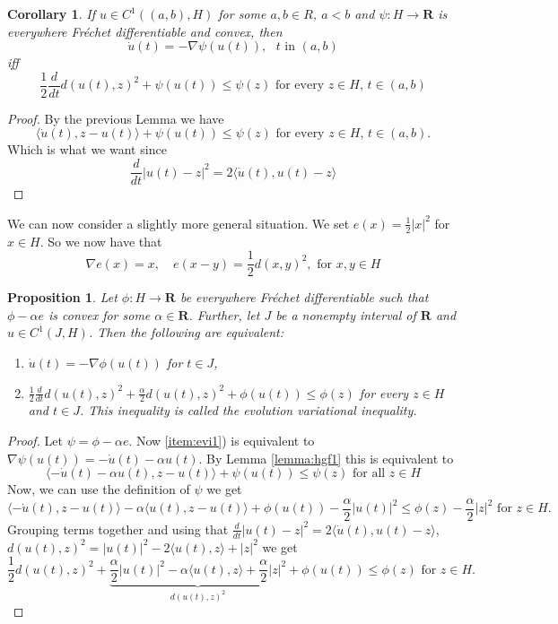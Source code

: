 \documentclass[a4paper,11pt, leqno]{scrreprt} %
\renewcommand{\leq}{\leqslant}
\renewcommand{\leq}{\leqslant}
\newcommand{\R}{\mathbf R}
\theoremstyle{change}
\newcounter{acounter}[chapter]
\newtheorem{corollary}[acounter]{Corollary}
\newtheorem{proposition}[acounter]{Proposition}
\theoremstyle{nonumberplain}
\newtheorem{proof}{Proof}
\begin{document}
\begin{corollary}
If $u \in C^1((a,b),H)$ for some $a,b \in R$, $a < b$ and $\psi:H \to \R$ is everywhere Fr\'echet differentiable and convex, then
\[
\dot{u}(t) = -\nabla \psi(u(t)), \text{ $t$ in $(a,b)$}
\]
iff
\[
\frac{1}{2} \frac{d}{dt} d(u(t), z)^2 + \psi(u(t)) \leq \psi(z) \text{ for every $z \in H$, $t \in (a,b)$}
\]

\end{corollary}
\begin{proof}
By the previous Lemma we have
\[
\langle \dot{u}(t), z - u(t) \rangle + \psi(u(t)) \leq \psi(z) \text{ for every $z \in H$, $t \in (a,b)$.}
\]
Which is what we want since
\begin{equation*}
\frac{d}{dt} |u(t) - z|^2 = 2 \langle \dot{u}(t), u(t) - z \rangle
\end{equation*}
\end{proof}

We can now consider a slightly more general situation. We set $e(x) = \frac{1}{2} |x|^2$ for $x \in H$. So we now have that
\begin{equation}
\nabla e(x) = x, \quad e(x - y) = \frac{1}{2} d(x,y)^2, \text{ for $x,y \in H$}
\end{equation}

\begin{proposition}
Let $\phi: H \to \R$ be everywhere Fr\'echet differentiable such that $\phi - \alpha e$ is convex for some $\alpha \in \R$. Further, let $J$ be a nonempty interval of $\mathbf R$ and $u \in C^1(J,H)$. Then the following are equivalent:
\begin{enumerate}
  \item \label{item:evi1} $\dot{u}(t) = -\nabla \phi(u(t))$ for $t \in J$,
  \item $\displaystyle \frac{1}{2} \frac{d}{dt} d(u(t), z)^2 + \frac{\alpha}{2} d(u(t), z)^2 + \phi(u(t)) \leq \phi(z)$ for every $z \in H$ and $t \in J$. This inequality is called the \textit{evolution variational inequality}.
\end{enumerate}
\end{proposition}

\begin{proof}
Let $\psi = \phi - \alpha e$. Now \ref{item:evi1}) is equivalent to $\nabla \psi(u(t)) = -\dot{u}(t) - \alpha u(t)$. By Lemma \ref{lemma:hgf1} this is equivalent to
\[
\langle -\dot{u}(t) - \alpha u(t), z - u(t) \rangle + \psi(u(t)) \leq \psi(z) \text{ for all $z \in H$}
\]
Now, we can use the definition of $\psi$ we get
\[
\langle - \dot{u}(t), z - u(t) \rangle - \alpha \langle u(t), z - u(t) \rangle + \phi(u(t)) - \frac{\alpha}{2} |u(t)|^2 \leq \phi(z) - \frac{\alpha}{2} |z|^2 \text{ for $z \in H$}.
\]
Grouping terms together and using that $\frac{d}{dt} |u(t) - z|^2 = 2 \langle \dot{u}(t), u(t) - z \rangle$, $d(u(t), z)^2 = |u(t)|^2 - 2 \langle u(t), z \rangle + |z|^2$ we get
\begin{equation*}
\frac{1}{2} d(u(t), z)^2 + \underbrace{\frac{\alpha}{2} |u(t)|^2 - \alpha \langle u(t), z \rangle + \frac{\alpha}{2} |z|^2}_{d(u(t), z)^2} + \phi(u(t)) \leq \phi(z) \text{ for $z \in H$}.
\end{equation*}
\end{proof}
\end{document}
